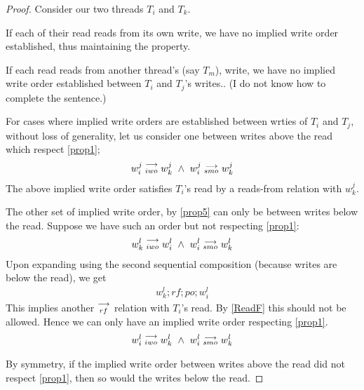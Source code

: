     \begin{proof}
        
        Consider our two threads $T_i$ and $T_k$. 

        If each of their read reads from its own write, we have no implied write order established, thus maintaining the property.
        
        If each read reads from another thread's (say $T_m$), write, we have no implied write order established between $T_i$ and $T_j$'s writes.. (I do not know how to complete the sentence.)

        For cases where implied write orders are established between wrties of $T_i$ and $T_j$, without loss of generality, let us consider one between writes above the read which respect \ref{prop1}; 
        \begin{align}
            w_i^j\stackrel{\longrightarrow}{_{iwo}}w_k^j \ \wedge \ w_i^j\stackrel{\longrightarrow}{_{smo}}w_k^j
        \end{align}
        The above implied write order satisfies $T_i$'s read by a reads-from relation with $w_k^j$. 

        The other set of implied write order, by \ref{prop5} can only be between writes below the read. Suppose we have such an order but not respecting \ref{prop1}:
        \begin{align}
            w_k^l\stackrel{\longrightarrow}{_{iwo}}w_i^l \ \wedge \ w_i^l\stackrel{\longrightarrow}{_{smo}}w_k^l
        \end{align}
        Upon expanding using the second sequential composition (because writes are below the read), we get
        \begin{align}
            w_k^l;rf;po;w_i^l 
        \end{align}
        This implies another $\stackrel{\longrightarrow}{_{rf}}$ relation with $T_i$'s read. By \ref{ReadF} this should not be allowed. Hence we can only have an implied write order respecting \ref{prop1}.
        \begin{align}
            w_i^l\stackrel{\longrightarrow}{_{iwo}}w_k^l \ \wedge \ w_i^l\stackrel{\longrightarrow}{_{smo}}w_k^l
        \end{align}


        By symmetry, if the implied write order between writes above the read did not respect \ref{prop1}, then so would the writes below the read.  
    \end{proof}

